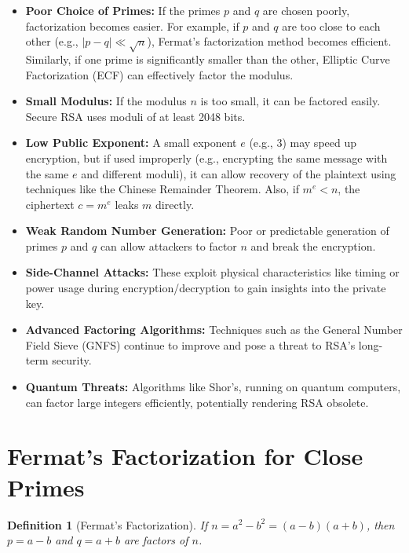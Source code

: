 \documentclass{article}
\newtheorem{definition}{Definition}
\begin{document}
\begin{itemize}
    \item \textbf{Poor Choice of Primes:} If the primes $p$ and $q$ are chosen poorly, factorization becomes easier. For example, if $p$ and $q$ are too close to each other (e.g., $|p-q| \ll \sqrt{n}$), Fermat's factorization method becomes efficient. Similarly, if one prime is significantly smaller than the other, Elliptic Curve Factorization (ECF) can effectively factor the modulus.

    \item \textbf{Small Modulus:} If the modulus $n$ is too small, it can be factored easily. Secure RSA uses moduli of at least 2048 bits.

    \item \textbf{Low Public Exponent:} A small exponent $e$ (e.g., 3) may speed up encryption, but if used improperly (e.g., encrypting the same message with the same $e$ and different moduli), it can allow recovery of the plaintext using techniques like the Chinese Remainder Theorem. Also, if $m^e < n$, the ciphertext $c = m^e$ leaks $m$ directly.

    \item \textbf{Weak Random Number Generation:} Poor or predictable generation of primes $p$ and $q$ can allow attackers to factor $n$ and break the encryption.

    \item \textbf{Side-Channel Attacks:} These exploit physical characteristics like timing or power usage during encryption/decryption to gain insights into the private key.

    \item \textbf{Advanced Factoring Algorithms:} Techniques such as the General Number Field Sieve (GNFS) continue to improve and pose a threat to RSA's long-term security.

    \item \textbf{Quantum Threats:} Algorithms like Shor's, running on quantum computers, can factor large integers efficiently, potentially rendering RSA obsolete.
\end{itemize}

\section{Fermat's Factorization for Close Primes}

\begin{definition}[Fermat's Factorization]
    If $n = a^2 - b^2 = (a - b)(a + b)$, then $p = a - b$ and $q = a + b$ are factors of $n$.
\end{definition}
\end{document}
